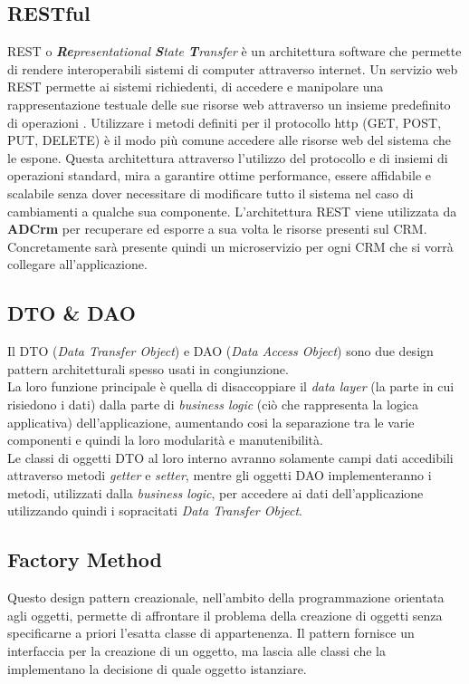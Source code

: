 \documentclass[12pt,a4paper,twoside,openany,english]{book}
\begin{document}
\subsection{RESTful}\label{rest}
REST o \textit{\textbf{Re}presentational \textbf{S}tate \textbf{T}ransfer} è un architettura software che permette di rendere interoperabili sistemi di computer attraverso internet. 
Un servizio web REST permette ai sistemi richiedenti, di accedere e manipolare una rappresentazione testuale delle sue risorse web attraverso un insieme predefinito di operazioni .
Utilizzare i metodi definiti per il protocollo \gls{http} (GET, POST, PUT, DELETE) è il modo più comune accedere alle risorse web del sistema che le espone.
Questa architettura attraverso l'utilizzo del protocollo  e di insiemi di operazioni standard, mira a garantire ottime performance, essere affidabile e scalabile senza dover necessitare di modificare tutto il sistema nel caso di cambiamenti a qualche sua componente.
L'architettura REST viene utilizzata da \textbf{ADCrm\textbf{}} per recuperare ed esporre a sua volta le risorse presenti sul \gls{CRM}.
Concretamente sarà presente quindi un microservizio per ogni \gls{CRM} che si vorrà collegare all'applicazione.

\subsection{DTO \& DAO}
Il \gls{DTO} (\textit{Data Transfer Object}) e \gls{DAO} (\textit{Data Access Object}) sono due design pattern architetturali spesso usati in congiunzione.\\
La loro funzione principale è quella di disaccoppiare il \textit{data layer} (la parte in cui risiedono i dati) dalla parte di \textit{business logic} (ciò che rappresenta la logica applicativa) dell'applicazione, aumentando cosi la separazione tra le varie componenti e quindi la loro modularità e manutenibilità.\\
Le classi di oggetti \gls{DTO} al loro interno avranno solamente campi dati accedibili attraverso metodi \textit{getter} e \textit{setter}, mentre gli oggetti \gls{DAO} implementeranno i metodi, utilizzati dalla \textit{business logic}, per accedere ai dati dell'applicazione utilizzando quindi i sopracitati \textit{Data Transfer Object}.

\subsection{Factory Method} \label{factory}
Questo design pattern creazionale, nell'ambito della programmazione orientata agli oggetti, permette di affrontare il problema della creazione di oggetti senza specificarne a priori l'esatta classe di appartenenza.
Il pattern fornisce un interfaccia per la creazione di un oggetto, ma lascia alle classi che la implementano la decisione di quale oggetto istanziare.\\
\end{document}
